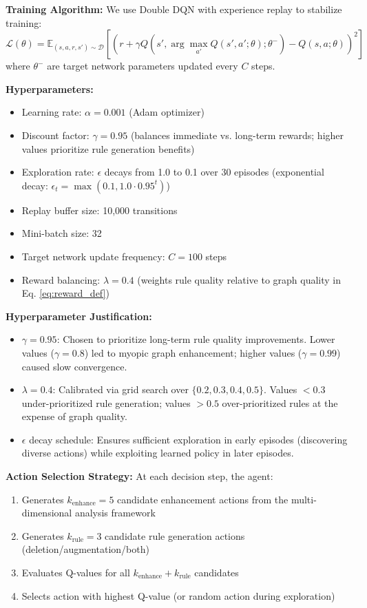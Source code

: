 \documentclass[runningheads]{llncs}
\begin{document}
\textbf{Training Algorithm:}
We use Double DQN with experience replay to stabilize training:
\begin{equation}
\mathcal{L}(\theta) = \mathbb{E}_{(s,a,r,s') \sim \mathcal{D}} \left[ \left( r + \gamma Q(s', \arg\max_{a'} Q(s', a'; \theta); \theta^-) - Q(s, a; \theta) \right)^2 \right]
\end{equation}
where $\theta^-$ are target network parameters updated every $C$ steps.

\textbf{Hyperparameters:}
\begin{itemize}
    \item Learning rate: $\alpha = 0.001$ (Adam optimizer)
    \item Discount factor: $\gamma = 0.95$ (balances immediate vs. long-term rewards; higher values prioritize rule generation benefits)
    \item Exploration rate: $\epsilon$ decays from 1.0 to 0.1 over 30 episodes (exponential decay: $\epsilon_t = \max(0.1, 1.0 \cdot 0.95^t)$)
    \item Replay buffer size: 10,000 transitions
    \item Mini-batch size: 32
    \item Target network update frequency: $C = 100$ steps
    \item Reward balancing: $\lambda = 0.4$ (weights rule quality relative to graph quality in Eq. \ref{eq:reward_def})
\end{itemize}

\textbf{Hyperparameter Justification:}
\begin{itemize}
    \item $\gamma = 0.95$: Chosen to prioritize long-term rule quality improvements. Lower values ($\gamma = 0.8$) led to myopic graph enhancement; higher values ($\gamma = 0.99$) caused slow convergence.
    \item $\lambda = 0.4$: Calibrated via grid search over $\{0.2, 0.3, 0.4, 0.5\}$. Values $< 0.3$ under-prioritized rule generation; values $> 0.5$ over-prioritized rules at the expense of graph quality.
    \item $\epsilon$ decay schedule: Ensures sufficient exploration in early episodes (discovering diverse actions) while exploiting learned policy in later episodes.
\end{itemize}

\textbf{Action Selection Strategy:}
At each decision step, the agent:
\begin{enumerate}
    \item Generates $k_{\text{enhance}} = 5$ candidate enhancement actions from the multi-dimensional analysis framework
    \item Generates $k_{\text{rule}} = 3$ candidate rule generation actions (deletion/augmentation/both)
    \item Evaluates Q-values for all $k_{\text{enhance}} + k_{\text{rule}}$ candidates
    \item Selects action with highest Q-value (or random action during exploration)
\end{enumerate}
\end{document}
